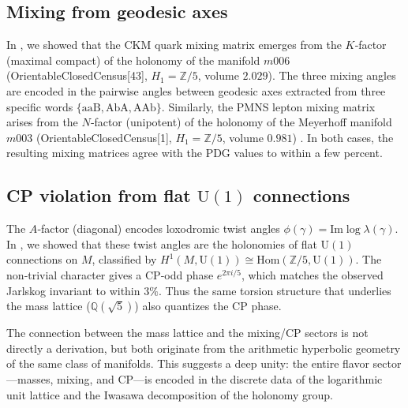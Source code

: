 \documentclass[12pt]{article}
\theoremstyle{definition}
\begin{document}
\subsection{Mixing from geodesic axes}
In \cite{Gentry:CKM}, we showed that the CKM quark mixing matrix emerges from the $K$‑factor (maximal compact) of the holonomy of the manifold $m006$ (OrientableClosedCensus[43], $H_1=\mathbb{Z}/5$, volume $2.029$). The three mixing angles are encoded in the pairwise angles between geodesic axes extracted from three specific words $\{\mathrm{aaB},\mathrm{AbA},\mathrm{AAb}\}$. Similarly, the PMNS lepton mixing matrix arises from the $N$‑factor (unipotent) of the holonomy of the Meyerhoff manifold $m003$ (OrientableClosedCensus[1], $H_1=\mathbb{Z}/5$, volume $0.981$) \cite{Gentry:PMNS}. In both cases, the resulting mixing matrices agree with the PDG values to within a few percent.

\subsection{CP violation from flat $\mathrm{U}(1)$ connections}
The $A$‑factor (diagonal) encodes loxodromic twist angles $\phi(\gamma)=\mathrm{Im}\log\lambda(\gamma)$. In \cite{Gentry:CP}, we showed that these twist angles are the holonomies of flat $\mathrm{U}(1)$ connections on $M$, classified by $H^1(M,\mathrm{U}(1))\cong\mathrm{Hom}(\mathbb{Z}/5,\mathrm{U}(1))$. The non‑trivial character gives a CP‑odd phase $e^{2\pi i/5}$, which matches the observed Jarlskog invariant to within $3\%$. Thus the same torsion structure that underlies the mass lattice ($\mathbb{Q}(\sqrt5)$) also quantizes the CP phase.

The connection between the mass lattice and the mixing/CP sectors is not directly a derivation, but both originate from the arithmetic hyperbolic geometry of the same class of manifolds. This suggests a deep unity: the entire flavor sector—masses, mixing, and CP—is encoded in the discrete data of the logarithmic unit lattice and the Iwasawa decomposition of the holonomy group.
\end{document}
